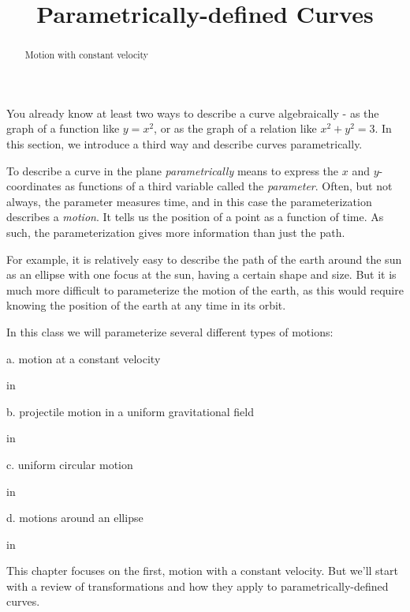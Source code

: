 \documentclass{ximera}
\title{Parametrically-defined Curves}
\newcommand{\pskip}{\vskip 0.1 in}
\begin{document}
\begin{abstract}
Motion with constant velocity
\end{abstract}
\maketitle

You already know at least two ways to describe a curve algebraically - as  the graph of a function like $y=x^2$, or as the graph of a relation like $x^2 + y^2 = 3$. In this section, we introduce a third way and describe curves parametrically. 

To describe a curve in the plane \emph{parametrically} means to express the $x$ and $y$-coordinates as functions of a third variable called the \emph{parameter}. Often, but not always, the parameter measures time, and in this case the parameterization describes a \emph{motion}. It tells us the position of a point as a function of time. As such, the parameterization gives more information than just the path.%

For example, it is relatively easy to describe the path of the earth around the sun as an ellipse with one focus at the sun, having a certain shape and size. But it is much more difficult to parameterize the motion of the earth, as this would require knowing the position of the earth at any time in its orbit.

In this class we will parameterize several different types of motions:

a. motion at a constant velocity

\pskip

b. projectile motion in a uniform gravitational field

\pskip

c. uniform circular motion

\pskip

d. motions around an ellipse

\pskip

This chapter focuses on the first, motion with a constant velocity. But we'll start with a review of transformations and how they apply to parametrically-defined curves.
\end{document}
